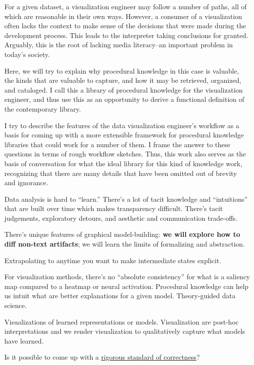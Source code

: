 \documentclass[
]{article}
\begin{document}
For a given dataset, a visualization engineer may follow a number of
paths, all of which are reasonable in their own ways. However, a
consumer of a visualization often lacks the context to make sense of the
decisions that were made during the development process. This leads to
the interpreter taking conclusions for granted. Arguably, this is the
root of lacking media literacy--an important problem in today's society.

Here, we will try to explain why procedural knowledge in this case is
valuable, the kinds that are valuable to capture, and how it may be
retrieved, organized, and cataloged. I call this a library of procedural
knowledge for the visualization engineer, and thus use this as an
opportunity to derive a functional definition of the contemporary
library.

I try to describe the features of the data visualization engineer's
workflow as a basis for coming up with a more extensible framework for
procedural knowledge libraries that could work for a number of them. I
frame the answer to these questions in terms of rough workflow sketches.
Thus, this work also serves as the basis of conversation for what the
ideal library for this kind of knowledge work, recognizing that there
are many details that have been omitted out of brevity and ignorance.

Data analysis is hard to ``learn.'' There's a lot of tacit knowledge and
``intuitions'' that are built over time which makes transparency
difficult. There's tacit judgements, exploratory detours, and aesthetic
and communication trade-offs.

There's unique features of graphical model-building: \textbf{we will
explore how to diff non-text artifacts}; we will learn the limits of
formalizing and abstraction.

Extrapolating to anytime you want to make intermediate states explicit.

For visualization methods, there's no ``absolute consistency'' for what
is a saliency map compared to a heatmap or neural activation. Procedural
knowledge can help us intuit what are better explanations for a given
model. Theory-guided data science.

Visualizations of learned representations or models. Visualization are
post-hoc interpretations and we render visualization to qualitatively
capture what models have learned.

Is it possible to come up with a
\href{https://dl.acm.org/doi/pdf/10.1145/3236386.3241340}{rigorous
standard of correctness}?
\end{document}
